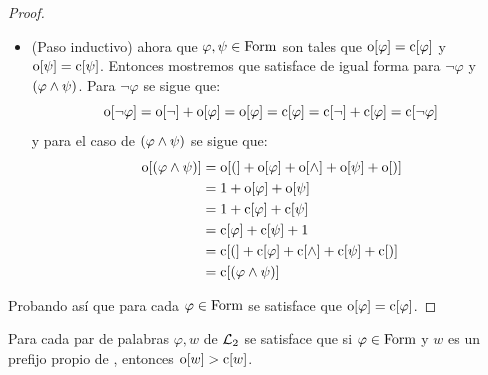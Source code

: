 \begin{agregado}
\begin{proof}
\begin{itemize}
\begin{enumerate}
\begin{align*}
				&= 1 +\CERRADO\bra*{t}\\
				&=\CERRADO\bra*{t} + 1\\
				&=\CERRADO\bra*{(} +\CERRADO\bra*{t} +\CERRADO\bra*{\in} +\CERRADO\bra*{X} +\CERRADO\bra*{)}\\
				&=\CERRADO\bra*{\pa*{t\in X}}\\
				&=\CERRADO\bra*{\varphi}
			\end{align*}
		\end{enumerate}
		En cualquier caso  satisface que $\ABIERTO\bra*{\varphi} =\CERRADO\bra*{\varphi}$.
		\item (Paso inductivo)  ahora que $\varphi,\psi\in\FORMULAS$ son tales que $\ABIERTO\bra*{\varphi} =\CERRADO\bra*{\varphi}$ y $\ABIERTO\bra*{\psi} =\CERRADO\bra*{\psi}$. Entonces mostremos que  satisface de igual forma para $\neg\varphi$ y $\pa*{\varphi\land\psi}$. Para $\neg\varphi$ se sigue que:
		\[
			\ABIERTO\bra*{\neg\varphi} =\ABIERTO\bra*{\neg} +\ABIERTO\bra*{\varphi} =\ABIERTO\bra*{\varphi} =\CERRADO\bra*{\varphi} =\CERRADO\bra*{\neg} +\CERRADO\bra*{\varphi} =\CERRADO\bra*{\neg\varphi}
		\]
		y para el caso de $\pa*{\varphi\land\psi}$ se sigue que:
		\begin{align*}
			\ABIERTO\bra*{\pa*{\varphi\land\psi}} &=\ABIERTO\bra*{(} +\ABIERTO\bra*{\varphi} +\ABIERTO\bra*{\land} +\ABIERTO\bra*{\psi} +\ABIERTO\bra*{)}\\
			&= 1 +\ABIERTO\bra*{\varphi} +\ABIERTO\bra*{\psi}\\
			&= 1 +\CERRADO\bra*{\varphi} +\CERRADO\bra*{\psi}\\
			&=\CERRADO\bra*{\varphi} +\CERRADO\bra*{\psi} + 1\\
			&=\CERRADO\bra*{(} +\CERRADO\bra*{\varphi} +\CERRADO\bra*{\land} +\CERRADO\bra*{\psi} +\CERRADO\bra*{)}\\
			&=\CERRADO\bra*{\pa*{\varphi\land\psi}}
		\end{align*}
	\end{itemize}
	Probando así que para cada $\varphi\in\FORMULAS$ se satisface que $\ABIERTO\bra*{\varphi} =\CERRADO\bra*{\varphi}$.
\end{proof}

\begin{theorem}
	\label{theo: prefijos_formulas}
	Para cada par de palabras $\varphi, w$ de $\ARITMETICA$ se satisface que si $\varphi\in\FORMULAS$ y $w$ es un prefijo propio de , entonces $\ABIERTO\bra*{w} >\CERRADO\bra*{w}$.
\end{theorem}


\end{agregado}
